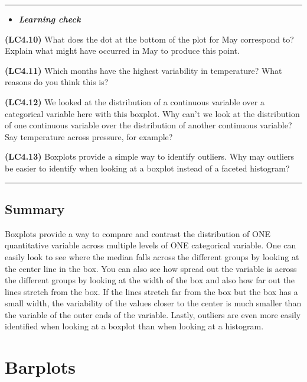 \documentclass[]{tufte-book}
\let\oldrule=\rule
\renewcommand{\rule}[1]{\oldrule{\linewidth}}
\newenvironment{rmdblock}[1]
  {\begin{shaded*}
  \begin{itemize}
  \renewcommand{\labelitemi}{
    \raisebox{-.7\height}[0pt][0pt]{
    }
  }
  \item
  }
  {
  \end{itemize}
  \end{shaded*}
  }
\newenvironment{learncheck}
  {\begin{rmdblock}{warning}}
  {\end{rmdblock}}
\begin{document}
\begin{center}\rule{0.5\linewidth}{\linethickness}\end{center}

\begin{learncheck}
\textbf{\emph{Learning check}}
\end{learncheck}

\textbf{(LC4.10)} What does the dot at the bottom of the plot for May
correspond to? Explain what might have occurred in May to produce this
point.

\textbf{(LC4.11)} Which months have the highest variability in
temperature? What reasons do you think this is?

\textbf{(LC4.12)} We looked at the distribution of a continuous variable
over a categorical variable here with this boxplot. Why can't we look at
the distribution of one continuous variable over the distribution of
another continuous variable? Say temperature across pressure, for
example?

\textbf{(LC4.13)} Boxplots provide a simple way to identify outliers.
Why may outliers be easier to identify when looking at a boxplot instead
of a faceted histogram?

\begin{center}\rule{0.5\linewidth}{\linethickness}\end{center}

\subsection{Summary}\label{summary-1}

Boxplots provide a way to compare and contrast the distribution of ONE
quantitative variable across multiple levels of ONE categorical
variable. One can easily look to see where the median falls across the
different groups by looking at the center line in the box. You can also
see how spread out the variable is across the different groups by
looking at the width of the box and also how far out the lines stretch
from the box. If the lines stretch far from the box but the box has a
small width, the variability of the values closer to the center is much
smaller than the variable of the outer ends of the variable. Lastly,
outliers are even more easily identified when looking at a boxplot than
when looking at a histogram.

\section{Barplots}\label{barplots}
\end{document}
